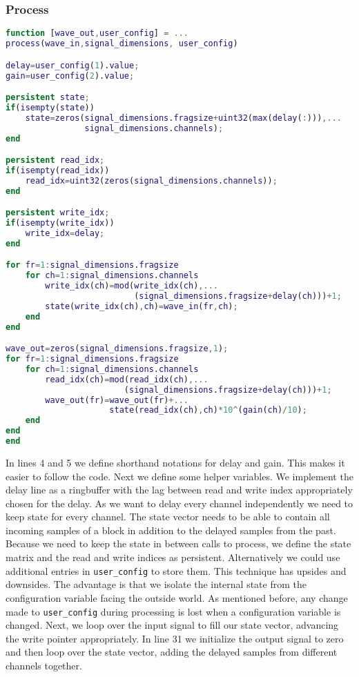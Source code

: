 \documentclass[11pt,a4paper,twoside]{article}
\newcommand{\+}{\discretionary{\mbox{\scriptsize$\hookleftarrow$}}{}{}}
\begin{document}
\subsubsection*{Process}
\begin{lstlisting}[language=Matlab]
function [wave_out,user_config] = ...
process(wave_in,signal_dimensions, user_config)

delay=user_config(1).value;
gain=user_config(2).value;

persistent state;
if(isempty(state))
    state=zeros(signal_dimensions.fragsize+uint32(max(delay(:))),...
                signal_dimensions.channels);
end

persistent read_idx;
if(isempty(read_idx))
    read_idx=uint32(zeros(signal_dimensions.channels));
end

persistent write_idx;
if(isempty(write_idx))
    write_idx=delay;
end

for fr=1:signal_dimensions.fragsize
    for ch=1:signal_dimensions.channels
        write_idx(ch)=mod(write_idx(ch),...
                          (signal_dimensions.fragsize+delay(ch)))+1;
        state(write_idx(ch),ch)=wave_in(fr,ch);
    end
end

wave_out=zeros(signal_dimensions.fragsize,1);
for fr=1:signal_dimensions.fragsize
    for ch=1:signal_dimensions.channels
        read_idx(ch)=mod(read_idx(ch),... 
                        (signal_dimensions.fragsize+delay(ch)))+1;
        wave_out(fr)=wave_out(fr)+...
                     state(read_idx(ch),ch)*10^(gain(ch)/10);
    end
end
end
\end{lstlisting}
In lines 4 and 5 we define shorthand notations for delay and gain. This makes it
easier to follow the code.
Next we define some helper variables. We implement
the delay line as a ringbuffer with the lag between read and write index
appropriately chosen for the delay. As we want to delay every channel
independently we need to keep state for every channel. The state vector
needs to be able to contain all incoming samples of a block in addition to the
delayed samples from the past. Because we need to keep the state in between
calls to process, we define the state matrix and the read and write indices as
persistent. Alternatively we could use additional entries in \texttt{user\_config} to
store them. This technique has upsides and downsides. The advantage is that we
isolate the internal state from the configuration variable facing the outside
world. As mentioned before, any change made to \texttt{user\_config} during processing
is lost when a configuration variable is changed. Next, we loop over the input
signal to fill our state vector, advancing the write pointer appropriately. In
line 31 we initialize the output signal to zero and then loop over the state
vector, adding the delayed samples from different channels together.
\end{document}
